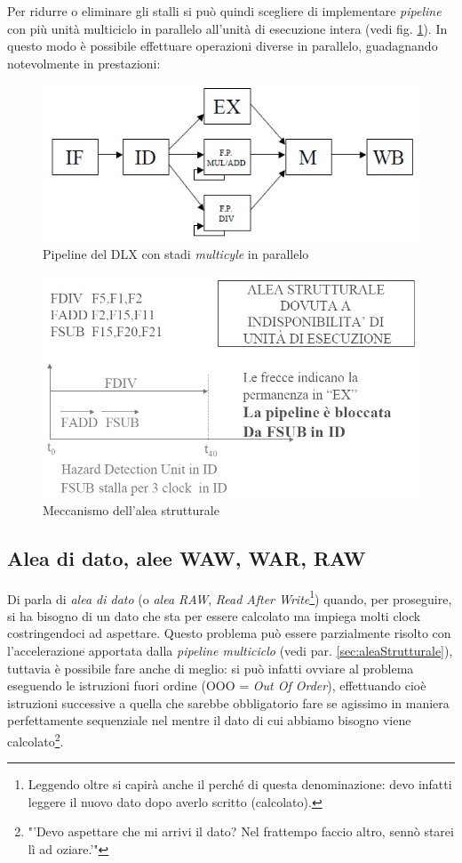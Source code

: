 Per ridurre o eliminare gli stalli si può quindi scegliere di implementare \textit{pipeline} con più unità multiciclo in parallelo all'unità di esecuzione intera (vedi fig. \ref{fig:multicycle}). In questo modo è possibile effettuare operazioni diverse in parallelo, guadagnando notevolmente in prestazioni: 

\begin{figure}[!h]
\centering
\includegraphics[width=0.55\columnwidth]{img/multicycle}
\caption{Pipeline del DLX con stadi \textit{multicyle} in parallelo}
\label{fig:multicycle}
\end{figure}

\begin{figure}[!h]
\centering
\includegraphics[width=0.7\columnwidth]{img/aleaStrutturale}
\caption{Meccanismo dell'alea strutturale}
\label{fig:aleaStrutturale}
\end{figure}

\subsection{Alea di dato, alee WAW, WAR, RAW}
\label{sec:aleaDato}

Di parla di \textit{alea di dato} (o \textit{alea RAW}, \textit{Read After Write}\footnote{Leggendo oltre si capirà anche il perché di questa denominazione: devo infatti leggere il nuovo dato dopo averlo scritto (calcolato).}) quando, per proseguire, si ha bisogno di un dato che sta per essere calcolato ma impiega molti clock costringendoci ad aspettare. Questo problema può essere parzialmente risolto con l'accelerazione apportata dalla \textit{pipeline multiciclo} (vedi par. \ref{sec:aleaStrutturale}), tuttavia è possibile fare anche di meglio: si può infatti ovviare al problema eseguendo le istruzioni fuori ordine (OOO = \textit{Out Of Order}), effettuando cioè istruzioni successive a quella che sarebbe obbligatorio fare se agissimo in maniera perfettamente sequenziale nel mentre il dato di cui abbiamo bisogno viene calcolato\footnote{"'Devo aspettare che mi arrivi il dato? Nel frattempo faccio altro, sennò starei lì ad oziare.'"}.

